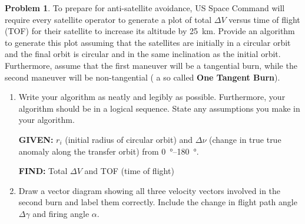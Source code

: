 \documentclass[10pt]{article}
\theoremstyle{definition}
\newtheorem{prob}{Problem}[section]
\newenvironment{subprob}%
{\renewcommand{\theenumi}{\alph{enumi}}\renewcommand{\labelenumi}{(\theenumi)}\begin{enumerate}}%
{\end{enumerate}}%
\newcommand{\extrapage}{\clearpage\newpage\null\newpage}
\begin{document}
\begin{prob}
    To prepare for anti-satellite avoidance, US Space Command will require every satellite operator to generate a plot of total \( \Delta V \) versus time of flight (TOF) for their satellite to increase its altitude by \SI{25}{\kilo\meter}. 
    Provide an algorithm to generate this plot assuming that the satellites are initially in a circular orbit and the final orbit is circular and in the same inclination as the initial orbit. 
    Furthermore, assume that the first maneuver will be a tangential burn, while the second maneuver will be non-tangential ( a so called \textbf{One Tangent Burn}).

    \begin{subprob}
    \item Write your algorithm as neatly and legibly as possible.
        Furthermore, your algorithm should be in a logical sequence. 
        State any assumptions you make in your algorithm.

        \textbf{GIVEN:} \( r_i\) (initial radius of circular orbit) and \( \Delta \nu\) (change in true true anomaly along the transfer orbit) from \SIrange{0}{180}{\degree}.

        \textbf{FIND:} Total \( \Delta V\) and TOF (time of flight)
        
    \item Draw a vector diagram showing all three velocity vectors involved in the second burn and label them correctly.
        Include the change in flight path angle \( \Delta \gamma \) and firing angle \( \alpha \).
    \end{subprob} 
\end{prob}    

\extrapage
\extrapage
\end{document}
